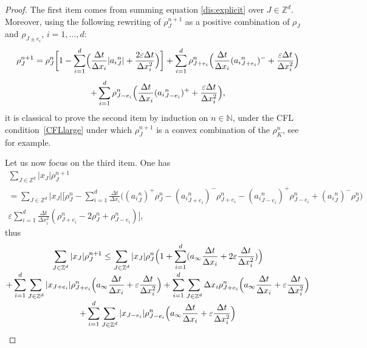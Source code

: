 \documentclass[11pt]{article}
\numberwithin{equation}{section}
\def\NN{\mathbb{N}}
\def\ZZ{\mathbb{Z}}
\def\eps{\varepsilon}
\def\dt{\Delta t}
\def\dx{\Delta x}
\theoremstyle{plain}
\theoremstyle{definition}
\begin{document}
\begin{proof}
The first item comes from summing equation \eqref{dis:explicit} over $J \in \ZZ^d$. Moreover, using the following rewriting of $\rho_{J}^{n+1}$ as a positive combination of $\rho_J$ and $\rho_{J\pm e_i}$, $i=1,\ldots,d$:\vspace*{-3pt}
\begin{multline*}
\rho_{J}^{n+1} = \rho_{J}^n \biggl[ 1 - \sum_{i=1}^d \Bigl(\frac{\dt}{\dx_i} |{a_i}^n_{J}| + \frac{2\eps\dt}{\dx_i^2}\Bigr) \biggr]
+ \sum_{i=1}^d \rho_{J+e_i}^n \Bigl(\frac{\dt}{\dx_i}({a_i}^n_{J+e_i})^- + \frac{\eps\dt}{\dx_i^2}\Bigr)\notag\\[-5pt] \\[-8pt]
+ \sum_{i=1}^d \rho_{J-e_i}^n \Bigl(\frac{\dt}{\dx_i}({a_i}^n_{J-e_i})^+ + \frac{\eps\dt}{\dx_i^2}\Bigr), \notag
\end{multline*}
it is classical to prove the second item by induction on $n \in \NN$, under the CFL condition~\eqref{CFLlarge} under which $\rho_J^{n+1}$ is a convex combination of the $\rho_K^n$, see \cite{leveque} for example.
\item Let us now focus on the third item. One has\vspace*{-5pt}
\begin{multline*}
\sum_{J\in \ZZ^d} |x_J|\rho_{J}^{n+1} \\[-3pt]
=
\sum_{J\in \ZZ^d} |x_J|\biggl[ \rho_{J}^n- \sum_{i=1}^{d} \frac{\dt}{\dx_i}
\Big(({a_i}^n_{J})^+ \rho_{J}^n - ({a_i}^n_{J+e_i})^- \rho_{J+e_i}^n
-({a_i}^n_{J-e_i})^+ \rho_{J-e_i}^n + ({a_i}^n_{J})^- \rho_{J}^n \Big) \\[-3pt]
\eps \sum_{i=1}^{d} \frac{\dt}{\dx_i^2} \left(\rho_{J+e_i}^n - 2\rho_J^n + \rho_{J-e_i}^n \right)\biggr],
\end{multline*}
thus\vspace*{-5pt}
\begin{multline*}
\sum_{J\in \ZZ^d} |x_J|\rho_{J}^{n+1} \leq \sum_{J\in \ZZ^d} |x_J|\rho_{J}^{n}
\Bigl( 1 + \sum_{i = 1}^d (a_\infty \frac{\Delta t}{\Delta x_i} + 2 \eps \frac{\Delta t}{\Delta x_i^2})\Bigr) \\[-3pt]
+ \sum_{i = 1}^d \sum_{J\in \ZZ^d} |x_{J+e_i}|\rho_{J + e_i}^{n} \Bigl(a_\infty \frac{\Delta t}{\Delta x_i} + \eps \frac{\Delta t}{\Delta x_i^2}\Bigr)
+ \sum_{i = 1}^d \sum_{J\in \ZZ^d} \Delta x_i\rho_{J + e_i}^{n} \Bigl(a_\infty \frac{\Delta t}{\Delta x_i} + \eps \frac{\Delta t}{\Delta x_i^2}\Bigr) \\[-3pt]
+ \sum_{i = 1}^d \sum_{J\in \ZZ^d} |x_{J-e_i}|\rho_{J - e_i}^{n} \Bigl(a_\infty \frac{\Delta t}{\Delta x_i} + \eps \frac{\Delta t}{\Delta x_i^2}\Bigr)

\end{multline*}
\end{proof}
\end{document}
